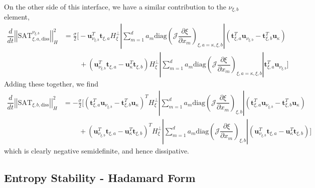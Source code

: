 \documentclass[12pt,a4paper]{article}
\newcommand{\pder}[2][]{\dfrac{\partial #1}{\partial #2}} %
\newcommand{\der}[2][]{\dfrac{d #1}{d #2}} %
\newcommand{\norm}[1]{\left\vert \left\vert #1 \right\vert \right\vert} %
\newcommand{\fn}[1]{\mathcal{#1}} %
\begin{document}
On the other side of this interface, we have a similar contribution to the $\nu_{\xi, b}$ element,
\begin{align*}
\der{t} \norm{ \text{SAT}_{\xi,a,\text{diss}}^{\nu_{\xi, b}} }^2_{H} &= 
\frac{\sigma}{2} \Bigg[ - \bm{u}^T_{\nu_{\xi, b}} \bm{t}_{\xi,a} H^{\bot}_{\xi} \left\vert \sum_{m=1}^d a_m \text{diag} \left( \fn{J} \pder[\xi]{x_m} \right)_{\xi,a = \kappa,\xi,b} \right\vert \left( \bm{t}^T_{\xi,a} \bm{u}_{\nu_{\xi,b}} - \bm{t}^T_{\xi,b} \bm{u}_\kappa   \right) \\
&  \qquad \  + \left(  \bm{u}_{\nu_{\xi,b}}^T \bm{t}_{\xi,a} -  \bm{u}_\kappa^T \bm{t}_{\xi,b}   \right) H^{\bot}_{\xi} \left\vert \sum_{m=1}^d a_m \text{diag} \left( \fn{J} \pder[\xi]{x_m} \right)_{\xi,a = \kappa,\xi,b} \right\vert  \bm{t}^T_{\xi,a} \bm{u}_{\nu_{\xi, b}}  \Bigg]
\end{align*}
Adding these together, we find
\begin{align*}
\der{t} \norm{ \text{SAT}_{\xi,b,\text{diss}} }^2_{H} &= 
- \frac{\sigma}{2} \Bigg[ \left( \bm{t}^T_{\xi,a} \bm{u}_{\nu_{\xi,b}} - \bm{t}^T_{\xi,b} \bm{u}_\kappa   \right)^T H^{\bot}_{\xi} \left\vert \sum_{m=1}^d a_m \text{diag} \left( \fn{J} \pder[\xi]{x_m} \right)_{\xi,b} \right\vert \left( \bm{t}^T_{\xi,a} \bm{u}_{\nu_{\xi,b}} - \bm{t}^T_{\xi,b} \bm{u}_\kappa   \right) \\
&  \qquad \  + \left(  \bm{u}_{\nu_{\xi,b}}^T \bm{t}_{\xi,a} -  \bm{u}_\kappa^T \bm{t}_{\xi,b}   \right)^T H^{\bot}_{\xi} \left\vert \sum_{m=1}^d a_m \text{diag} \left( \fn{J} \pder[\xi]{x_m} \right)_{\xi,b} \right\vert  \left(  \bm{u}_{\nu_{\xi,b}}^T \bm{t}_{\xi,a} -  \bm{u}_\kappa^T \bm{t}_{\xi,b}   \right)  \Bigg]
\end{align*}
which is clearly negative semidefinite, and hence dissipative.


\subsection{Entropy Stability - Hadamard Form}
\end{document}
